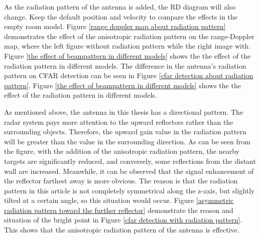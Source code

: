 \documentclass[12pt,DIV14,BCOR12mm,a4paper,footinclude=false,headinclude,parskip=half-,twoside,openright,cleardoublepage=empty,toc=index,bibliography=totoc,listof=totoc]{scrreprt}
\numberwithin{equation}{chapter}
\begin{document}
As the radiation pattern of the antenna is added, the RD diagram will also change. Keep the default position and velocity to compare the effects in the empty room model. Figure \ref{range doppler map about radiation pattern} demonstrates the effect of the anisotropic radiation pattern on the range-Doppler map, where the left figure without radiation pattern while the right image with. Figure \ref{the effect of beampattern in different models} shows the the effect of the radiation pattern in different models. The difference in the antenna's radiation pattern on CFAR detection can be seen in Figure \ref{cfar detection about radiation pattern}. Figure \ref{the effect of beampattern in different models} shows the the effect of the radiation pattern in different models.

As mentioned above, the antenna in this thesis has a directional pattern. The radar system pays more attention to the upward reflectors rather than the surrounding objects. Therefore, the upward gain value in the radiation pattern will be greater than the value in the surrounding direction. As can be seen from the figure, with the addition of the anisotropic radiation pattern, the nearby targets are significantly reduced, and conversely, some reflections from the distant wall are increased. Meanwhile, it can be observed that the signal enhancement of the reflector farthest away is more obvious. The reason is that the radiation pattern in this article is not completely symmetrical along the z-axis, but slightly tilted at a certain angle, so this situation would occur. Figure \ref{asymmetric radiation pattern toward the further reflector} demonstrate the reason and situation of the bright point in Figure \ref{cfar detection with radiation pattern}. This shows that the anisotropic radiation pattern of the antenna is effective.
\end{document}
